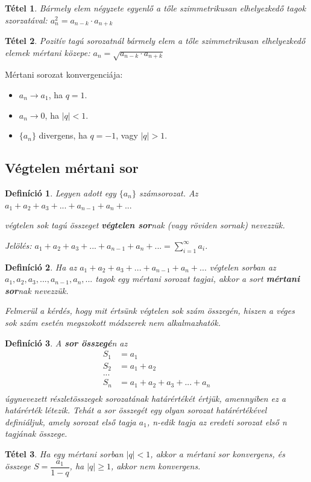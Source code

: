 \documentclass[12pt,a4paper]{article}
\newtheorem{theorem}{Tétel} [section]
\newtheorem{definition}{Definíció} [section]
\begin{document}
\begin{theorem}
Bármely elem négyzete egyenlő a tőle szimmetrikusan elhelyezkedő tagok szorzatával: $a_n^2=a_{n-k}\cdot a_{n+k}$
\end{theorem}

\begin{theorem}
Pozitív tagú sorozatnál bármely elem a tőle szimmetrikusan elhelyezkedő elemek mértani közepe: $a_n=\sqrt{a_{n-k}\cdot a_{n+k}}$
\end{theorem}

Mértani sorozat konvergenciája:
\begin{itemize}
\item $a_n\to a_1$, ha $q=1$.
\item $a_n\to 0$, ha $|q|<1$.
\item $\{a_n\}$ divergens, ha $q=-1$, vagy $|q|>1$.
\end{itemize}

\subsection{Végtelen mértani sor}

\begin{definition}
Legyen adott egy $\{a_n\}$ számsorozat. Az $a_1+a_2+a_3+...+a_{n-1}+a_n+...$

végtelen sok tagú összeget \textbf{végtelen sor}nak (vagy röviden sornak) nevezzük.

Jelölés: $a_1+a_2+a_3+...+a_{n-1}+a_n+...=\sum\limits^\infty_{i=1}a_i$.
\end{definition}

\begin{definition}
Ha az $a_1+a_2+a_3+...+a_{n-1}+a_n+...$ végtelen sorban az $a_1, a_2, a_3, ..., a_{n-1}, a_n, ...$ tagok egy mértani sorozat tagjai, akkor a sort \textbf{mértani sor}nak nevezzük.

Felmerül a kérdés, hogy mit értsünk végtelen sok szám összegén, hiszen a véges sok szám esetén megszokott módszerek nem alkalmazhatók.
\end{definition}

\begin{definition}
A \textbf{sor összegé}n az
\begin{align*}
S_1&=a_1 \\
S_2&=a_1+a_2 \\
... \\
S_n&=a_1+a_2+a_3+...+a_n \\
\end{align*}
úgynevezett részletösszegek sorozatának határértékét értjük, amennyiben ez a határérték létezik. Tehát a sor összegét egy olyan sorozat határértékével definiáljuk, amely sorozat első tagja $a_1$, n-edik tagja az eredeti sorozat első n tagjának összege.
\end{definition}
\begin{theorem}
Ha egy mértani sorban $|q|<1$, akkor a mértani sor konvergens, és összege $S=\dfrac{a_1}{1-q}$, ha $|q|\geq 1$, akkor nem konvergens.
\end{theorem}
\newpage
\end{document}
